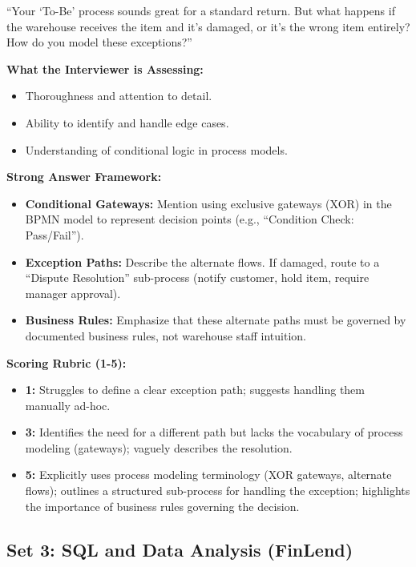 ``Your `To-Be' process sounds great for a standard return. But what
happens if the warehouse receives the item and it's damaged, or it's the
wrong item entirely? How do you model these exceptions?''

\textbf{What the Interviewer is Assessing:}

\begin{itemize}
\tightlist
\item
  Thoroughness and attention to detail.
\item
  Ability to identify and handle edge cases.
\item
  Understanding of conditional logic in process models.
\end{itemize}

\textbf{Strong Answer Framework:}

\begin{itemize}
\tightlist
\item
  \textbf{Conditional Gateways:} Mention using exclusive gateways (XOR)
  in the BPMN model to represent decision points (e.g., ``Condition
  Check: Pass/Fail'').
\item
  \textbf{Exception Paths:} Describe the alternate flows. If damaged,
  route to a ``Dispute Resolution'' sub-process (notify customer, hold
  item, require manager approval).
\item
  \textbf{Business Rules:} Emphasize that these alternate paths must be
  governed by documented business rules, not warehouse staff intuition.
\end{itemize}

\textbf{Scoring Rubric (1-5):}

\begin{itemize}
\tightlist
\item
  \textbf{1:} Struggles to define a clear exception path; suggests
  handling them manually ad-hoc.
\item
  \textbf{3:} Identifies the need for a different path but lacks the
  vocabulary of process modeling (gateways); vaguely describes the
  resolution.
\item
  \textbf{5:} Explicitly uses process modeling terminology (XOR
  gateways, alternate flows); outlines a structured sub-process for
  handling the exception; highlights the importance of business rules
  governing the decision.
\end{itemize}

\bigskip

\subsection{Set 3: SQL and Data Analysis
(FinLend)}\label{set-3-sql-and-data-analysis-finlend}

